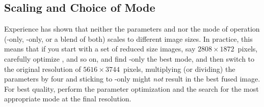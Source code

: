 \subsection[Scaling and Choice of Mode]{Scaling and Choice of Mode
  }

Experience has shown that neither the parameters 
and  nor the mode of operation
(-only, -only, or a blend of both) scales
to different image sizes.  In practice, this means that if you start
with a set of reduced size images, say $2808 \times 1872$~pixels,
carefully optimize ,  and so on,
and find -only the best mode, and then switch to the
original resolution of $5616 \times 3744$~pixels, multiplying (or
dividing) the parameters by four and sticking to -only
might \emph{not} result in the best fused image.  For best quality,
perform the parameter optimization and the search for the most
appropriate mode at the final resolution.
